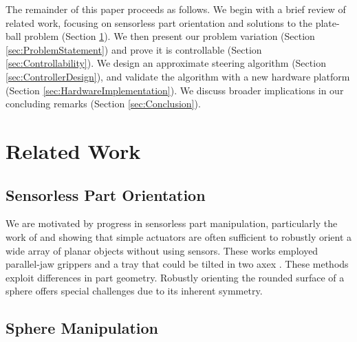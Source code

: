 \documentclass[letter paper, 10pt, conference]{ieeeconf}
\begin{document}
The remainder of this paper proceeds as follows. We begin with a brief review of related work, focusing on sensorless part orientation and solutions to the plate-ball problem (Section \ref{sec:RelatedWork}). We then present our problem variation (Section \ref{sec:ProblemStatement}) and prove it is controllable (Section \ref{sec:Controllability}).  We design an approximate steering algorithm (Section \ref{sec:ControllerDesign}), 
and validate the algorithm with a new hardware platform (Section \ref{sec:HardwareImplementation}).  We discuss broader implications in our concluding remarks (Section \ref{sec:Conclusion}).




\section{Related Work}\label{sec:RelatedWork}

\subsection{Sensorless Part Orientation}
We are motivated by progress in sensorless part manipulation, particularly the work of   \cite{Erdmann1988}  and \cite{Canny1994} showing that simple actuators are often sufficient to robustly orient a wide array of planar objects without using sensors.  These works employed parallel-jaw grippers  \cite{Canny1994} and a tray that could be tilted in two axex  \cite{Erdmann1988}. These methods exploit differences in part geometry. Robustly orienting the rounded surface of a sphere offers special challenges due to its inherent symmetry. 

\subsection{Sphere Manipulation}
\end{document}
